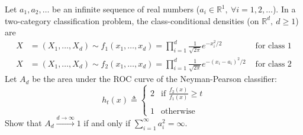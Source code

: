 \documentclass[11pt]{report}
\begin{document}
\begin{enumerate}[1.]
	      Let $a_1,a_2,\ldots$ be an infinite sequence of real numbers
	      ($a_i \in\mathds{R}^1,\ \forall i=1,2,\ldots$). In a two-category classification problem, the class-conditional densities (on $\mathds{R}^d,\ d\geq 1$) are
	      \begin{align*}
		      X                                       & =(X_1,\ldots,X_d)\sim f_1(x_1,\ldots,x_d)=\prod_{i=1}^d
		      \frac{1}{\sqrt{2\pi}}e^{-x_i^2/2}       & \mbox{ for class 1}                                     \\
		      X                                       & =(X_1,\ldots,X_d)\sim f_2(x_1,\ldots,x_d)=\prod_{i=1}^d
		      \frac{1}{\sqrt{2\pi}}e^{-(x_i-a_i)^2/2} & \mbox{ for class 2}
	      \end{align*}
	      Let $A_d$ be the area under the ROC curve of the Neyman-Pearson classifier:
	      $$
		      h_t(x) \triangleq \left\{
		      \begin{array}{ll}
			      2 & \mbox{if \ \ $\displaystyle \frac{f_2(x)}{f_1(x)} \geq t$} \\ \\
			      1 & \mbox{otherwise}
		      \end{array}
		      \right.
	      $$
	      Show that $\displaystyle A_d\stackrel{d \rightarrow \infty}{\longrightarrow} 1$
	      if and only if $\displaystyle \sum_{i=1}^\infty a_i^2 = \infty$.





\end{enumerate}
\end{document}
